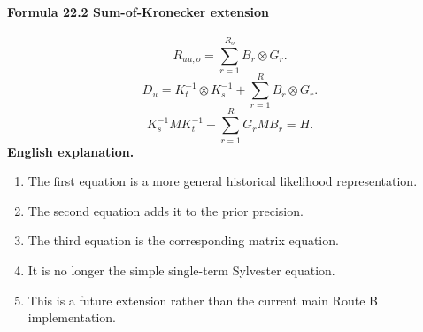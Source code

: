 \documentclass[12pt]{article}
\begin{document}
\paragraph{Formula 22.2 Sum-of-Kronecker extension}
\[
R_{uu,o}=\sum_{r=1}^{R_o}B_r\otimes G_r.
\]
\[
D_u=K_t^{-1}\otimes K_s^{-1}+\sum_{r=1}^R B_r\otimes G_r.
\]
\[
K_s^{-1}MK_t^{-1}+\sum_{r=1}^RG_rMB_r=H.
\]
\textbf{English explanation.}
\begin{enumerate}[leftmargin=2em]
\item The first equation is a more general historical likelihood representation.
\item The second equation adds it to the prior precision.
\item The third equation is the corresponding matrix equation.
\item It is no longer the simple single-term Sylvester equation.
\item This is a future extension rather than the current main Route B implementation.
\end{enumerate}
\end{document}
